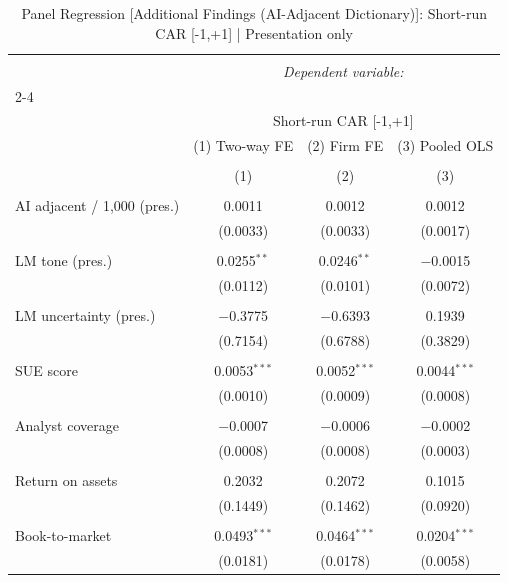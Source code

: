 
\begin{table}[!htbp] \centering 
  \caption{Panel Regression [Additional Findings (AI-Adjacent Dictionary)]: Short-run CAR [-1,+1]  |  Presentation only} 
  \label{} 
\begin{tabular}{@{\extracolsep{5pt}}lccc} 
\\[-1.8ex]\hline 
\hline \\[-1.8ex] 
 & \multicolumn{3}{c}{\textit{Dependent variable:}} \\ 
\cline{2-4} 
\\[-1.8ex] & \multicolumn{3}{c}{Short-run CAR [-1,+1]} \\ 
 & (1) Two-way FE & (2) Firm FE & (3) Pooled OLS \\ 
\\[-1.8ex] & (1) & (2) & (3)\\ 
\hline \\[-1.8ex] 
 AI adjacent / 1,000 (pres.) & 0.0011 & 0.0012 & 0.0012 \\ 
  & (0.0033) & (0.0033) & (0.0017) \\ 
  & & & \\ 
 LM tone (pres.) & 0.0255$^{**}$ & 0.0246$^{**}$ & $-$0.0015 \\ 
  & (0.0112) & (0.0101) & (0.0072) \\ 
  & & & \\ 
 LM uncertainty (pres.) & $-$0.3775 & $-$0.6393 & 0.1939 \\ 
  & (0.7154) & (0.6788) & (0.3829) \\ 
  & & & \\ 
 SUE score & 0.0053$^{***}$ & 0.0052$^{***}$ & 0.0044$^{***}$ \\ 
  & (0.0010) & (0.0009) & (0.0008) \\ 
  & & & \\ 
 Analyst coverage & $-$0.0007 & $-$0.0006 & $-$0.0002 \\ 
  & (0.0008) & (0.0008) & (0.0003) \\ 
  & & & \\ 
 Return on assets & 0.2032 & 0.2072 & 0.1015 \\ 
  & (0.1449) & (0.1462) & (0.0920) \\ 
  & & & \\ 
 Book-to-market & 0.0493$^{***}$ & 0.0464$^{***}$ & 0.0204$^{***}$ \\ 
  & (0.0181) & (0.0178) & (0.0058) \\ 

\end{tabular}
\end{table}
